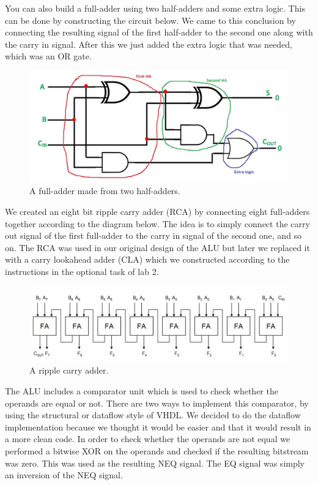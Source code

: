 \documentclass[a4paper,11pt]{article}
\begin{document}
You can also build a full-adder using two half-adders and some extra logic. This can be done by constructing the circuit below. We came to this conclusion by connecting the resulting signal of the first half-adder to the second one along with the carry in signal. After this we just added the extra logic that was needed, which was an OR gate.

\begin{figure}[h!]
  \centering
  \includegraphics[width=0.5\linewidth]{fulladderfromhalfadder.jpg}
  \caption{A full-adder made from two half-adders.}
  \label{fig:etikett}
\end{figure}

We created an eight bit ripple carry adder (RCA) by connecting eight full-adders together according to the diagram below. The idea is to simply connect the carry out signal of the first full-adder to the carry in signal of the second one, and so on. The RCA was used in our original design of the ALU but later we replaced it with a carry lookahead adder (CLA) which we constructed according to the instructions in the optional task of lab 2. 

\begin{figure}[h!]
  \includegraphics[width=\linewidth]{rca.jpg}
  \caption{A ripple carry adder.}
  \label{fig:etikett}
\end{figure}

The ALU includes a comparator unit which is used to check whether the operands are equal or not. There are two ways to implement this comparator, by using the structural or dataflow style of VHDL. We decided to do the dataflow implementation because we thought it would be easier and that it would result in a more clean code. In order to check whether the operands are not equal we performed a bitwise XOR on the operands and checked if the resulting bitstream was zero. This was used as the resulting NEQ signal. The EQ signal was simply an inversion of the NEQ signal. 
\end{document}
